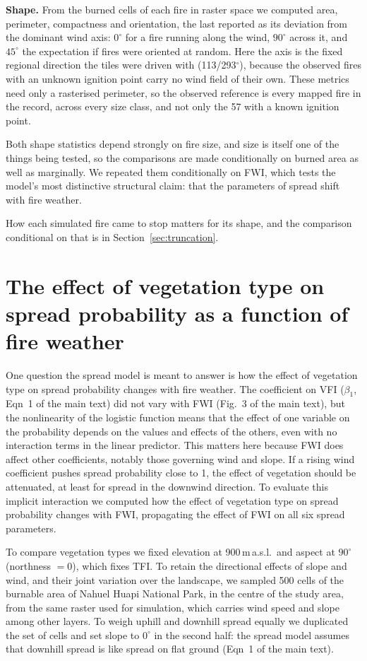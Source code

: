 \documentclass[11pt,a4paper]{article}
\begin{document}
\textbf{Shape.} From the burned cells of each fire in raster space we computed area,
perimeter, compactness and orientation, the last reported as its deviation from the
dominant wind axis: $0^\circ$ for a fire running along the wind, $90^\circ$ across it, and
$45^\circ$ the expectation if fires were oriented at random. Here the axis is the fixed
regional direction the tiles were driven with (113/293$^\circ$), because the observed fires
with an unknown ignition point carry no wind field of their own. These metrics need only a
rasterised perimeter, so the observed reference is every mapped fire in the record, across
every size class, and not only the 57 with a known ignition point.

Both shape statistics depend strongly on fire size, and size is itself one of the things
being tested, so the comparisons are made conditionally on burned area as well as
marginally. We repeated them conditionally on FWI, which tests the model's most distinctive
structural claim: that the parameters of spread shift with fire weather.

How each simulated fire came to stop matters for its shape, and the comparison conditional on
that is in Section~\ref{sec:truncation}.

\section{The effect of vegetation type on spread probability as a function of
fire weather}
\label{sec:vegeffect}

One question the spread model is meant to answer is how the effect of
vegetation type on spread probability changes with fire weather. The
coefficient on VFI ($\beta_1$, Eqn~1 of the main text) did not vary with FWI
(Fig.~3 of the main text), but the nonlinearity of the logistic function means
that the effect of one variable on the probability depends on the values and
effects of the others, even with no interaction terms in the linear predictor.
This matters here because FWI does affect other coefficients, notably those
governing wind and slope. If a rising wind coefficient pushes spread
probability close to 1, the effect of vegetation should be attenuated, at least
for spread in the downwind direction. To evaluate this implicit interaction we
computed how the effect of vegetation type on spread probability changes with
FWI, propagating the effect of FWI on all six spread parameters.

To compare vegetation types we fixed elevation at 900\,m\,a.s.l.\ and aspect at
$90^\circ$ (northness $= 0$), which fixes TFI. To retain the directional effects
of slope and wind, and their joint variation over the landscape, we sampled 500
cells of the burnable area of Nahuel Huapi National Park, in the centre of the
study area, from the same raster used for simulation, which carries wind speed
and slope among other layers. To weigh uphill and downhill spread equally we
duplicated the set of cells and set slope to $0^\circ$ in the second half: the
spread model assumes that downhill spread is like spread on flat ground
(Eqn~1 of the main text).
\end{document}
